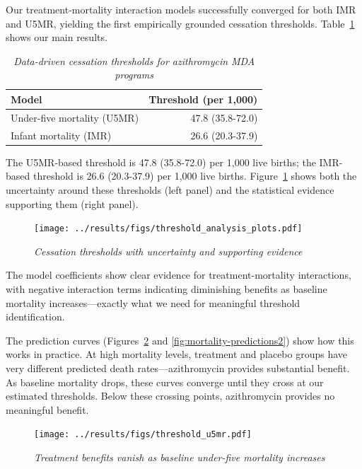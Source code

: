 \documentclass[11pt]{article}\usepackage[]{graphicx}\usepackage[]{xcolor}
\begin{document}
Our treatment-mortality interaction models successfully converged for both IMR and U5MR, yielding the first empirically grounded cessation thresholds. Table~\ref{tab:thresholds} shows our main results.

\begin{table}

\caption{\label{tab:threshold-results-table}\label{tab:thresholds}\emph{Data-driven cessation thresholds for azithromycin MDA programs}}
\centering
\begin{tabular}[t]{lr}
\toprule
Model & Threshold (per 1,000)\\
\midrule
Under-five mortality (U5MR) & 47.8 (35.8-72.0)\\
Infant mortality (IMR) & 26.6 (20.3-37.9)\\
\bottomrule
\end{tabular}
\end{table}



The U5MR-based threshold is 47.8 (35.8-72.0) per 1,000 live births; the IMR-based threshold is 26.6 (20.3-37.9) per 1,000 live births. Figure~\ref{fig:threshold-analysis} shows both the uncertainty around these thresholds (left panel) and the statistical evidence supporting them (right panel).

\begin{figure}[!h]
\centering
\texttt{[image: ../results/figs/threshold\_analysis\_plots.pdf]}
\caption{\emph{Cessation thresholds with uncertainty and supporting evidence}}
\label{fig:threshold-analysis}
\end{figure}

The model coefficients show clear evidence for treatment-mortality interactions, with negative interaction terms indicating diminishing benefits as baseline mortality increases---exactly what we need for meaningful threshold identification.

The prediction curves (Figures~\ref{fig:mortality-predictions1} and \ref{fig:mortality-predictions2}) show how this works in practice. At high mortality levels, treatment and placebo groups have very different predicted death rates---azithromycin provides substantial benefit. As baseline mortality drops, these curves converge until they cross at our estimated thresholds. Below these crossing points, azithromycin provides no meaningful benefit.

\begin{figure}[!h]
\centering
\texttt{[image: ../results/figs/threshold\_u5mr.pdf]}
\caption{\emph{Treatment benefits vanish as baseline under-five mortality increases}}
\label{fig:mortality-predictions1}
\end{figure}
\end{document}
